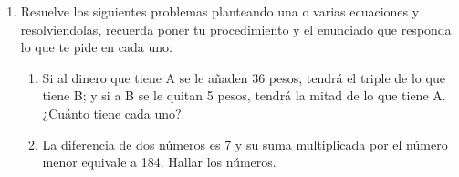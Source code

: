 \documentclass{article}
\begin{document}
\begin{enumerate}
\item Resuelve los siguientes problemas planteando una o varias ecuaciones y resolviendolas,
recuerda poner tu procedimiento y el enunciado que responda lo que te pide en cada
uno.

\begin{enumerate}
    \item Si al dinero que tiene A se le añaden 36 pesos, tendrá el triple de lo que tiene B;
y si a B se le quitan 5 pesos, tendrá la mitad de lo que tiene A. ¿Cuánto tiene
cada uno?
\item La diferencia de dos números es 7 y su suma multiplicada por el número menor
equivale a 184. Hallar los números.
\end{enumerate}

\end{enumerate}
\end{document}
